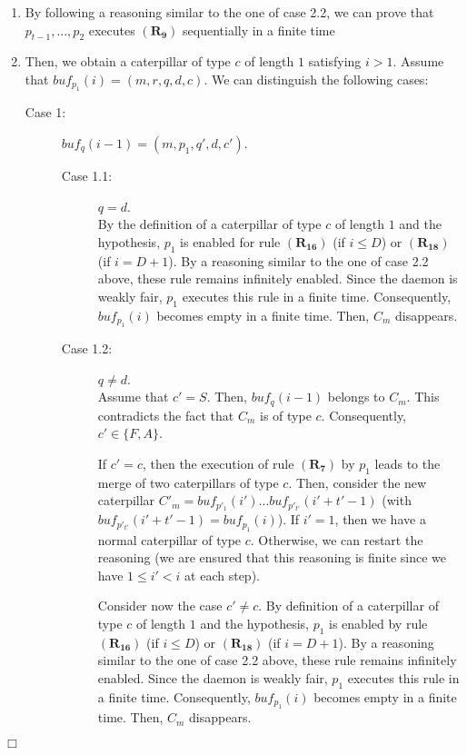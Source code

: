\documentclass[11pt]{article}
\newenvironment{proof}{{\noindent\bf Proof. } }{{\hfill $\Box$}}
\begin{document}
\begin{proof}
\begin{enumerate}
\begin{description}
\end{description}

\item By following a reasoning similar to the one of case 2.2, we can prove that $p_{t-1},...,p_{2}$ executes $\boldsymbol{(R_{9})}$ sequentially in a finite time
\item Then, we obtain a caterpillar of type $c$ of length $1$ satisfying $i>1$. Assume that $buf_{p_{1}}(i)=(m,r,q,d,c)$. We can distinguish the following cases:

\begin{description}
\item [Case 1:] $buf_{q}(i-1)=(m,p_{1},q',d,c')$.

\begin{description}
\item [Case 1.1:]  $q=d$.\\
By the definition of a caterpillar of type $c$ of length $1$ and the hypothesis, $p_{1}$ is enabled for rule $\boldsymbol{(R_{16})}$ (if $i\leq D$) or $\boldsymbol{(R_{18})}$ (if $i=D+1$). By a reasoning similar to the one of case 2.2 above, these rule remains infinitely enabled. Since the daemon is weakly fair, $p_{1}$ executes this rule in a finite time. Consequently, $buf_{p_{1}}(i)$ becomes empty in a finite time. Then, $C_{m}$ disappears.
\item [Case 1.2:] $q\neq d$.\\
Assume that $c'=S$. Then, $buf_{q}(i-1)$ belongs to $C_{m}$. This contradicts the fact that $C_{m}$ is of type $c$. Consequently, $c'\in\{F,A\}$. 

If $c'=c$, then the execution of rule $\boldsymbol{(R_{7})}$ by $p_{1}$ leads to the merge of two caterpillars of type $c$. Then, consider the new caterpillar  $C'_{m}=buf_{p'_{1}}(i')...buf_{p'_{t'}}(i'+t'-1)$ (with $buf_{p'_{t'}}(i'+t'-1)=buf_{p_{1}}(i)$). If $i'=1$, then we have a normal caterpillar of type $c$. Otherwise, we can restart the reasoning (we are ensured that this reasoning is finite since we have $1\leq i'<i$ at each step).

Consider now the case $c'\neq c$. By definition of a caterpillar of type $c$ of length $1$ and the hypothesis, $p_{1}$ is enabled by rule $\boldsymbol{(R_{16})}$ (if $i\leq D$) or $\boldsymbol{(R_{18})}$ (if $i=D+1$). By a reasoning similar to the one of case 2.2 above, these rule remains infinitely enabled. Since the daemon is weakly fair, $p_{1}$ executes this rule in a finite time. Consequently, $buf_{p_{1}}(i)$ becomes empty in a finite time. Then, $C_{m}$ disappears.
\end{description}


\end{description}
\end{enumerate}
\end{proof}
\end{document}
